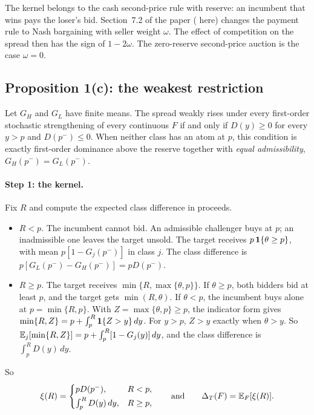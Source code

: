 \begin{caution}
The kernel belongs to the cash second-price rule with reserve: an incumbent that wins pays the loser's bid.
Section~7.2 of the paper ( here) changes the payment rule to Nash bargaining
with seller weight \(\omega\). The effect of competition on the spread then has the sign of \(1-2\omega\).
The zero-reserve second-price auction is the case \(\omega=0\).
\end{caution}

\subsection{Proposition 1(c): the weakest restriction}\label{sec:03_auction-prop1c}

\begin{resultbox}[Proposition 1(c)]
Let \(G_H\) and \(G_L\) have finite means. The spread weakly rises under every first-order stochastic
strengthening of every continuous \(F\) if and only if \(D(y)\ge0\) for every \(y>p\) and \(D(p^-)\le0\).
When neither class has an atom at \(p\), this condition is exactly first-order dominance above the reserve
together with \emph{equal admissibility}, \(G_H(p^-)=G_L(p^-)\).
\end{resultbox}

\paragraph{Step 1: the kernel.} Fix \(R\) and compute the expected class difference in proceeds.
\begin{itemize}
\item \(R<p\). The incumbent cannot bid. An admissible challenger buys at \(p\); an inadmissible one leaves
the target unsold. The target receives \(p\,\mathbf{1}\{\theta\ge p\}\), with mean \(p[1-G_j(p^-)]\) in class
\(j\). The class difference is \(p[G_L(p^-)-G_H(p^-)]=pD(p^-)\).
\item \(R\ge p\). The target receives \(\min\{R,\max\{\theta,p\}\}\). If \(\theta\ge p\), both bidders
bid at least \(p\), and the target gets \(\min(R,\theta)\). If \(\theta<p\), the incumbent buys alone at
\(p=\min\{R,p\}\). With \(Z=\max\{\theta,p\}\ge p\), the indicator form gives
\(\min\{R,Z\}=p+\int_p^R\mathbf{1}\{Z>y\}\,dy\). For \(y>p\), \(Z>y\) exactly when \(\theta>y\). So
\(\mathbb{E}_j[\min\{R,Z\}]=p+\int_p^R[1-G_j(y)]\,dy\), and the class difference is \(\int_p^RD(y)\,dy\).
\end{itemize}
So
\[
\xi(R)=\begin{cases} pD(p^-), & R<p,\\[2pt] \int_p^R D(y)\,dy, & R\ge p,\end{cases}
\qquad\text{and}\qquad \Delta_T(F)=\mathbb{E}_F[\xi(R)].
\]

